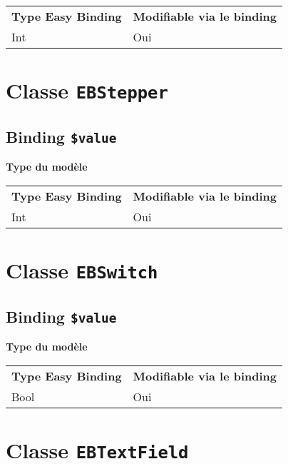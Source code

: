 \begin{tabular}{ll}
\textbf{Type Easy Binding} & \textbf{Modifiable via le binding}\\
Int& Oui\\
\end{tabular}







\section{Classe \texttt{EBStepper}}

\subsection{Binding \texttt{\$value}}

{\bf Type du modèle}

\begin{tabular}{ll}
\textbf{Type Easy Binding} & \textbf{Modifiable via le binding}\\
Int& Oui\\
\end{tabular}







\section{Classe \texttt{EBSwitch}}

\subsection{Binding \texttt{\$value}}

{\bf Type du modèle}

\begin{tabular}{ll}
\textbf{Type Easy Binding} & \textbf{Modifiable via le binding}\\
Bool& Oui\\
\end{tabular}







\section{Classe \texttt{EBTextField}}

